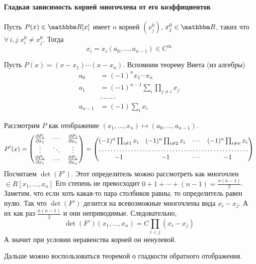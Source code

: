 \documentclass[12pt,timbord]{../../../notes}
\begin{document}
\paragraph{Гладкая зависимость корней многочлена от его коэффициентов}
\label{par:diffspace::smoothpolyroots}

\begin{thrm}\label{thrm:diffspace::smoothpolyroots}
  Пусть $P(x) \in \R[x]$ имеет $n$ корней $(x^0_j)$,  $x^0_j \in \R$, таких что $\forall\, i,j \; x^0_i \neq x^0_j$.  
  Тогда 
  \[
    x_i = x_i(a_0, \dotsc, a_{n-1}) \in C^\infty
  \]
\end{thrm}

\begin{ittproof}
  Пусть $P(x) = (x - x_1) \dotsm (x - x_n)$. Вспомним теорему Виета (из алгебры)
  \begin{align*}
    a_0     & = (-1)^n x_1 \dotsm x_n \\
    a_1     & = (-1)^{n-1} \sum_{i} \prod_{j \neq i} x_j \\
            & \cdots \cdots \cdots  \\
    a_{n-1} & = (-1) \sum_i x_i
  \end{align*}

  Рассмотрим $P$ как отображение $(x_1, \dotsc, x_n) \mapsto (a_0, \dotsc, a_{n-1})$.
  \[
    P'(x) = 
    \begin{pmatrix}
      \frac{\partial P_1}{\partial x_1} & \cdots & \frac{\partial P_1}{\partial x_n} \\
      \vdots & \ddots & \vdots \\
      \frac{\partial P_n}{\partial x_1} & \cdots & \frac{\partial P_n}{\partial x_n} \\
    \end{pmatrix}
    = 
    \begin{pmatrix}
      (-1)^n \prod_{i\neq 1} x_i & (-1)^n \prod_{i\neq 2} x_i & \cdots & (-1)^n \prod_{i\neq n} x_i \\
      \hdotsfor{4} \\
      -1 & -1 & \cdots & -1 
    \end{pmatrix}
  \]
  Посчитаем $\det(F')$. Этот определитель можно рассмотреть как многочлен $\in R[x_1, \dotsc, x_n]$
  Его степень не превосходит $0 + 1 + \dotsb + (n-1) = \frac{n(n-1)}{2}$. Заметим, что если хоть
  какая-то пара столбиков равны, то определитель равен нулю. Так что $\det(F')$ делится на
  всевозможные многочлены вида $x_i - x_j$. А их как раз $\frac{n(n-1)}{2}$ и они неприводимые.
  Следовательно, 
  \[
    \det (F')(x_1, \dotsc, x_n) = C \prod_{i<j} (x_i - x_j) 
  \]
  А значит при условии неравенства корней он ненулевой.

  Дальше можно воспользоваться теоремой о гладкости обратного отображения.
\end{ittproof}
\end{document}
